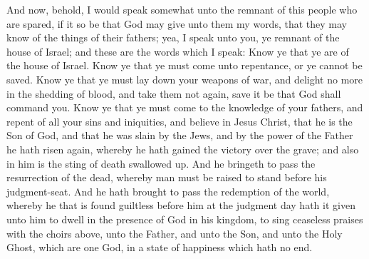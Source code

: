 And now, behold, I would speak somewhat unto the remnant of this people who are spared, if it so be that God may give unto them my words, that they may know of the things of their fathers; yea, I speak unto you, ye remnant of the house of Israel; and these are the words which I speak:
\bverse \iffalse Know ye that ye are of the house of Israel. \fi
Know ye that ye are of the house of Israel.
\bverse \iffalse Know ye that ye must come unto repentance, or ye cannot be saved. \fi
Know ye that ye must come unto repentance, or ye cannot be saved.
\bverse \iffalse Know ye that ye must lay down your weapons of war, and delight no more in the shedding of blood, and take them not again, save it be that God shall command you. \fi
Know ye that ye must lay down your weapons of war, and delight no more in the shedding of blood, and take them not again, save it be that God shall command you.
\bverse \iffalse Know ye that ye must come to the knowledge of your fathers, and repent of all your sins and iniquities, and believe in Jesus Christ, that he is the Son of God, and that he was slain by the Jews, and by the power of the Father he hath risen again, whereby he hath gained the victory over the grave; and also in him is the sting of death swallowed up. \fi
Know ye that ye must come to the knowledge of your fathers, and repent of all your sins and iniquities, and believe in Jesus Christ, that he is the Son of God, and that he was slain by the Jews, and by the power of the Father he hath risen again, whereby he hath gained the victory over the grave; and also in him is the sting of death swallowed up.
\bverse \iffalse And he bringeth to pass the resurrection of the dead, whereby man must be raised to stand before his judgment-seat. \fi
And he bringeth to pass the resurrection of the dead, whereby man must be raised to stand before his judgment-seat.
\bverse \iffalse And he hath brought to pass the redemption of the world, whereby he that is found guiltless before him at the judgment day hath it given unto him to dwell in the presence of God in his kingdom, to sing ceaseless praises with the choirs above, unto the Father, and unto the Son, and unto the Holy Ghost, which are one God, in a state of happiness which hath no end. \fi
And he hath brought to pass the redemption of the world, whereby he that is found guiltless before him at the judgment day hath it given unto him to dwell in the presence of God in his kingdom, to sing ceaseless praises with the choirs above, unto the Father, and unto the Son, and unto the Holy Ghost, which are one God, in a state of happiness which hath no end.
